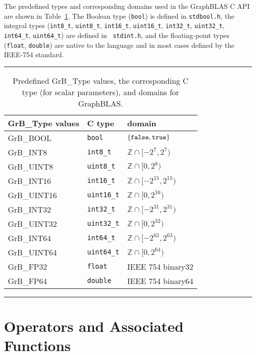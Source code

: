The predefined types and corresponding domains used in the GraphBLAS C API are
shown in Table~\ref{Tab:PredefinedTypes}.  The Boolean type ({\tt bool})
is defined in {\tt stdbool.h}, the integral types ({\tt int8\_t},
{\tt uint8\_t}, {\tt int16\_t}, {\tt uint16\_t}, {\tt int32\_t},
{\tt uint32\_t}, {\tt int64\_t}, {\tt uint64\_t}) are defined in {\tt
stdint.h}, and the floating-point types ({\tt float}, {\tt double}) are
native to the language and in most cases defined by the IEEE-754 standard.

\begin{table}
\hrule
\begin{center}
\caption{Predefined {\sf GrB\_Type} values, the corresponding C type (for scalar
parameters), and domains for GraphBLAS.}
\label{Tab:PredefinedTypes}
\begin{tabular}{l|l|l}
{\sf GrB\_Type values} & C type            & domain \\
\hline
{\sf GrB\_BOOL}        & {\tt bool}        & $\{ {\tt false}, {\tt true} \}$  \\
{\sf GrB\_INT8}        & {\tt int8\_t}     & $\mathbb{Z} \cap [-2^{7},2^{7})$  \\
{\sf GrB\_UINT8}       & {\tt uint8\_t}    & $\mathbb{Z} \cap [0,2{^8})$  \\
{\sf GrB\_INT16}       & {\tt int16\_t}    & $\mathbb{Z} \cap [-2^{15},2^{15})$ \\
{\sf GrB\_UINT16}      & {\tt uint16\_t}   & $\mathbb{Z} \cap [0,2^{16})$ \\
{\sf GrB\_INT32}       & {\tt int32\_t}    & $\mathbb{Z} \cap [-2^{31},2^{31})$ \\
{\sf GrB\_UINT32}      & {\tt uint32\_t}   & $\mathbb{Z} \cap [0,2^{32})$ \\
{\sf GrB\_INT64}       & {\tt int64\_t}    & $\mathbb{Z} \cap [-2^{63},2^{63})$ \\
{\sf GrB\_UINT64}      & {\tt uint64\_t}   & $\mathbb{Z} \cap [0,2^{64})$ \\
{\sf GrB\_FP32}        & {\tt float}       & IEEE 754 {\sf binary32}  \\
{\sf GrB\_FP64}        & {\tt double}      & IEEE 754 {\sf binary64}  \\
\end{tabular}
\end{center}
\hrule
\end{table}

\section{Operators and Associated Functions }

